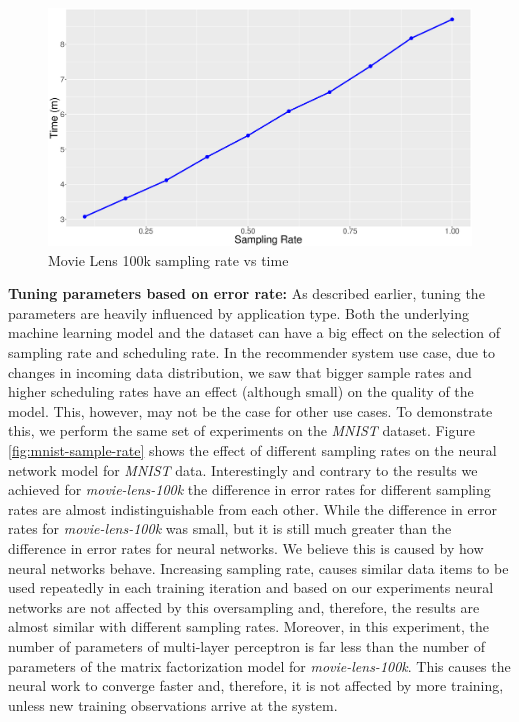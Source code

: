 \documentclass{vldb}
\begin{document}
\begin{figure}[H]
\centering
\includegraphics[width=\columnwidth]{../images/experiment-results/movie-lens-100k-sampling-time-improved.eps}
\caption{Movie Lens 100k sampling rate vs time}
\label{fig:movie-lens-100k-sample-rate-time}
\end{figure}

\textbf{Tuning parameters based on error rate:} As described earlier, tuning the parameters are heavily influenced by application type.
Both the underlying machine learning model and the dataset can have a big effect on the selection of sampling rate and scheduling rate.
In the recommender system use case, due to changes in incoming data distribution, we saw that bigger sample rates and higher scheduling rates have an effect (although small) on the quality of the model.
This, however, may not be the case for other use cases.
To demonstrate this, we perform the same set of experiments on the \textit{MNIST} dataset.
Figure \ref{fig:mnist-sample-rate} shows the effect of different sampling rates on the neural network model for \textit{MNIST} data.
Interestingly and contrary to the results we achieved for \textit{movie-lens-100k} the difference in error rates for different sampling rates are almost indistinguishable from each other.
While the difference in error rates for \textit{movie-lens-100k} was small, but it is still much greater than the difference in error rates for neural networks.
We believe this is caused by how neural networks behave.
Increasing sampling rate, causes similar data items to be used repeatedly in each training iteration and based on our experiments neural networks are not affected by this oversampling and, therefore, the results are almost similar with different sampling rates.
Moreover, in this experiment, the number of parameters of multi-layer perceptron is far less than the number of parameters of the matrix factorization model for \textit{movie-lens-100k}.
This causes the neural work to converge faster and, therefore, it is not affected by more training, unless new training observations arrive at the system.
\end{document}
